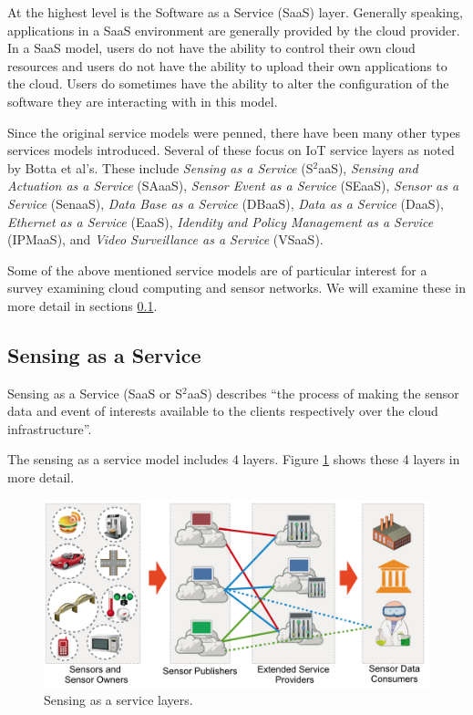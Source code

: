\documentclass[]{article}
\begin{document}
At the highest level is the Software as a Service (SaaS) layer. Generally speaking, applications in a SaaS environment are generally provided by the cloud provider. In a SaaS model, users do not have the ability to control their own cloud resources and users do not have the ability to upload their own applications to the cloud. Users do sometimes have the ability to alter the configuration of the software they are interacting with in this model.

Since the original service models were penned, there have been many other types services models introduced. Several of these focus on IoT service layers as noted by Botta et al's\cite{botta_integration_2016}. These include \textit{Sensing as a Service} (S$^2$aaS), \textit{Sensing and Actuation as a Service} (SAaaS), \textit{Sensor Event as a Service} (SEaaS), \textit{Sensor as a Service} (SenaaS), \textit{Data Base as a Service} (DBaaS), \textit{Data as a Service} (DaaS), \textit{Ethernet as a Service} (EaaS), \textit{Idendity and Policy Management as a Service} (IPMaaS), and \textit{Video Surveillance as a Service} (VSaaS).

Some of the above mentioned service models are of particular interest for a survey examining cloud computing and sensor networks. We will examine these in more detail in sections \ref{ssec:sensing-as-a-service}.

\subsection{Sensing as a Service} \label{ssec:sensing-as-a-service}
Sensing as a Service (SaaS or S$^2$aaS) describes ``the process of making the sensor data and event of interests available to the clients respectively over the cloud infrastructure''\cite{dash_survey_2010}. 

The sensing as a service model includes 4 layers\cite{perera_sensing_2014}. Figure \ref{fig:sensing-as-a-service} shows these 4 layers in more detail.

\begin{figure}
    \centering
    \includegraphics[width=1.0\linewidth]{img/sensing-as-a-service}
    \caption[Sensing as a service layers.]{Sensing as a service layers.\cite{perera_sensing_2014}}
    \label{fig:sensing-as-a-service}
\end{figure}
\end{document}
